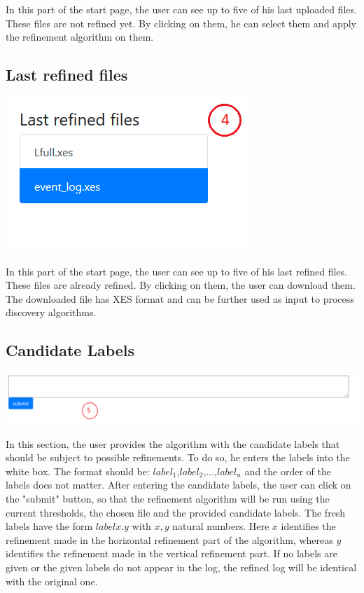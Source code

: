 \documentclass[notitlepage]{article}
\begin{document}
\begin{flushleft}
In this part of the start page, the user can see up to five of his last uploaded files. 
These files are not refined yet.
By clicking on them, he can select them and apply the refinement algorithm on them.

\subsection{Last refined files}

\includegraphics[scale=0.6]{lastRefinedFiles.png}

In this part of the start page, the user can see up to five of his last refined files. 
These files are already refined. 
By clicking on them, the user can download them.
The downloaded file has XES format and can be further used as input to process discovery algorithms.

\subsection{Candidate Labels}

\includegraphics[scale=0.5]{candidateLabels.png}

In this section, the user provides the algorithm with the candidate labels that should be subject to possible refinements. 
To do so, he enters the labels into the white box. 
The format should be: $label_1$,$label_2$,...,$label_n$ and the order of the labels does not matter.
After entering the candidate labels, the user can click on the "submit" button, so that the refinement algorithm will be run using the current thresholds, the chosen file and the provided candidate labels.
The fresh labels have the form $labelx.y$ with $x,y$ natural numbers.
Here $x$ identifies the refinement made in the horizontal refinement part of the algorithm, whereas $y$ identifies the refinement made in the vertical refinement part. 
If no labels are given or the given labels do not appear in the log, the refined log will be identical with the original one.



\end{flushleft}
\end{document}
